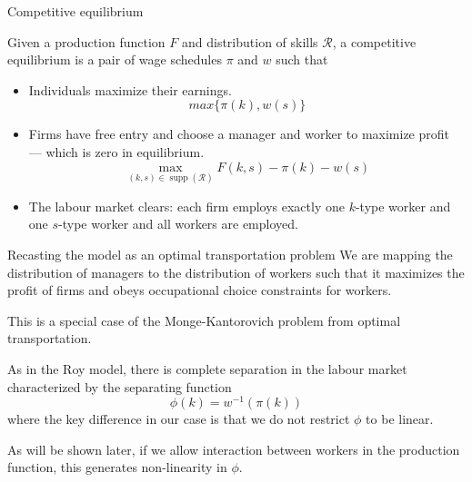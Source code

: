 \documentclass{beamer}
\DeclareMathOperator\supp{supp}
\begin{document}
		
	\begin{frame}{Competitive equilibrium}
		
		\begin{definition}
			Given a production function $F$ and distribution of skills $\mathcal{R}$, a competitive equilibrium is a pair of wage schedules $\pi$ and $w$ such that
			\smallskip
			\begin{itemize}
				\item Individuals maximize their earnings.
				 $$ max\{\pi(k),w(s)\} $$
				\item Firms have free entry and choose a manager and worker to maximize profit --- which is zero in equilibrium.
				$$ \max_{(k,s)\in\supp(\mathcal{R})} F(k,s) - \pi(k) - w(s) $$
				\item The labour market clears: each firm employs exactly one $k$-type worker and one $s$-type worker and all workers are employed. 
			\end{itemize}
		\end{definition}
		
	\end{frame}
	
	\begin{frame}{Recasting the model as an optimal transportation problem}
		We are mapping the distribution of managers to the distribution of workers such that it maximizes the profit of firms and obeys occupational choice constraints for workers.
		
		\bigskip
		
		This is a special case of the Monge-Kantorovich problem from optimal transportation.
		
		\bigskip
		
		As in the Roy model, there is complete separation in the labour market characterized by the separating function 
		\begin{equation*}
			\phi(k) = w^{-1}(\pi(k))
		\end{equation*}
		where the key difference in our case is that we do not restrict $\phi$ to be linear.
		
		\bigskip
		
		 As will be shown later, if we allow interaction between workers in the production function, this generates non-linearity in $\phi$.
	\end{frame}
	
\end{document}

